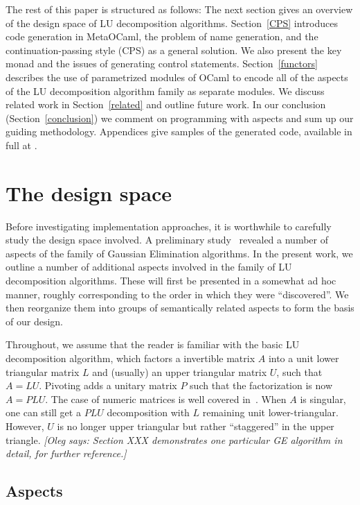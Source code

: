 \documentclass{elsart}
\newcommand{\oleg}[1]{{\it [Oleg says: #1]}}
\begin{document}
The rest of this paper is structured as follows: The next section
gives an overview of the design space of LU decomposition algorithms.
Section~\ref{CPS}
introduces code generation in MetaOCaml, the problem of name
generation, and the continuation-passing style (CPS) as a general
solution.  We also present the key monad and the issues of generating
control statements. Section~\ref{functors} describes the use of
parametrized modules of OCaml to encode all of the aspects of the
LU decomposition algorithm family as separate
modules.  We discuss related work in
Section~\ref{related} and outline future work. In our
conclusion (Section~\ref{conclusion}) we comment
on programming with aspects and sum up our guiding methodology.
Appendices give samples of the generated code, available in
full at \cite{metamonadsURL}.

\section{The design space}\label{design}

Before investigating implementation approaches, it is worthwhile to
carefully study the design space involved.  A preliminary
study~\cite{Carette06} revealed a number of aspects of the family of
Gaussian Elimination algorithms.  In the present work, we outline a
number of additional aspects involved in the family of LU
decomposition algorithms.  These will first be presented in a somewhat
ad hoc manner, roughly corresponding to the order in which they were
``discovered''.  We then reorganize them into groups of
semantically related aspects to form the basis of our design.

Throughout, we assume that the reader is familiar with the basic LU
decomposition algorithm, which factors a invertible matrix $A$ into a unit
lower triangular matrix $L$ and (usually) an upper triangular matrix $U$,
such that $A = LU$.  Pivoting adds a unitary matrix $P$ such
that the factorization is now $A = PLU$.  The case of numeric matrices is well
covered in~\cite{Golub-vanLoan}.  When $A$ is singular, one can still get
a $PLU$ decomposition with $L$ remaining unit lower-triangular. However, 
$U$ is no longer upper triangular but rather ``staggered''
in the upper triangle.
\oleg{Section XXX demonstrates one particular GE algorithm in detail,
  for further reference.}

\subsection{Aspects}
\end{document}
